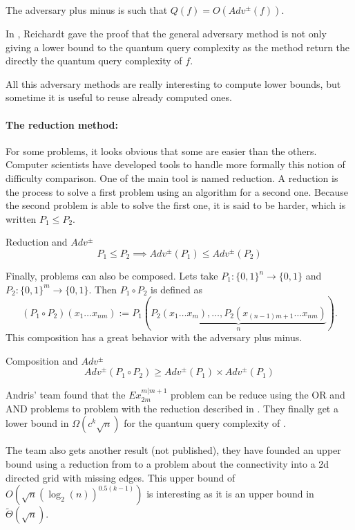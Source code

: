 \begin{itemize}
          \begin{theorem}
              The adversary plus minus is such that $Q(f) = O(Adv^{\pm}(f))$.
          \end{theorem}

          In \cite{Reichardt_2009}, Reichardt gave the proof that the general adversary method
          is not only giving a lower bound to the quantum query complexity as the method
          return the directly the quantum query complexity of $f$.
\end{itemize}

All this adversary methods are really interesting to compute lower bounds, but sometime it is
useful to reuse already computed ones.


\paragraph*{\textbf{The reduction method:}}

For some problems, it looks obvious that some are easier than the others.
Computer scientists have developed tools to handle more formally this notion
of difficulty comparison. One of the main tool is named reduction. A reduction
is the process to solve a first problem using an algorithm for a second one.
Because the second problem is able to solve the first one, it is said to be
harder, which is written $P_1 \leq P_2$.
\begin{theorem}{Reduction and $Adv^{\pm}$}
    \[P_1 \leq P_2 \implies Adv^{\pm}(P_1) \leq Adv^{\pm}(P_2)\]
\end{theorem}
Finally, problems can also be composed. Lets take $P_1:\{0, 1\}^n \to \{0, 1\}$
and $P_2:\{0, 1\}^m \to \{0, 1\}$. Then $P_1 \circ P_2$ is defined as
\[(P_1 \circ P_2)(x_1 \ldots x_{nm}) := P_1\left(\underbrace{P_2(x_1\ldots x_m), \ldots, P_2(x_{(n-1)m+1}\ldots x_{nm})}_{n}\right).\]
This composition has a great behavior with the adversary plus minus.
\begin{theorem}{Composition and $Adv^{\pm}$}
    \[Adv^{\pm}(P_1 \circ P_2) \geq Adv^{\pm}(P_1)\times Adv^{\pm}(P_1)\]
\end{theorem}
Andris' team found that the $Ex_{2m}^{m\vert m+1}$ problem can be reduce using the OR and AND
problems to  problem with the reduction described in \cite{art:2DGrid}. They finally
get a lower bound in $\Omega(c^k\sqrt{n})$ for the quantum query complexity of .

The team also gets another result (not published),
they have founded an upper bound using a reduction from
 to a problem about the connectivity into a 2d
directed grid with missing edges. This upper bound of
$O(\sqrt{n}(\log_2(n))^{0.5(k-1)})$ is interesting as it
is an upper bound in $\tilde{\Theta}(\sqrt{n})$.

